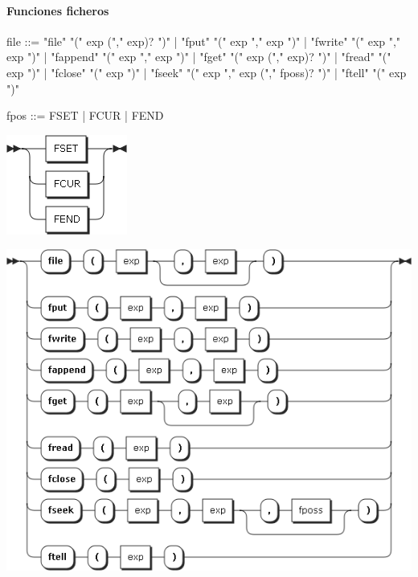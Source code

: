 \pagebreak
\paragraph{Funciones ficheros}
\begin{multicols}{2}
\begin{myverbatim}[style=nonumbers, basicstyle=\tiny]      
file ::= "file" "(" exp ("," exp)? ")"
   |  "fput" "(" exp "," exp ")"
   |  "fwrite" "(" exp "," exp ")"
   |  "fappend" "(" exp "," exp ")"
   |  "fget" "(" exp ("," exp)? ")"
   |  "fread" "(" exp ")"
   |  "fclose" "(" exp ")"
   |  "fseek" "(" exp "," exp ("," fposs)? ")"
   |  "ftell" "(" exp ")"

fpos ::= FSET
      |  FCUR
      |  FEND
\end{myverbatim}  
\begin{center}
\includegraphics[scale=0.4]{diagram/fpos.png} \\
\end{center}
\columnbreak	
\begin{center}
\includegraphics[scale=0.4]{diagram/file.png} \\
\end{center}

\end{multicols}

